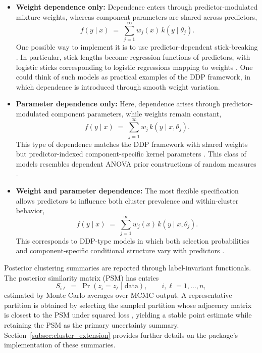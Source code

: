 \documentclass[article]{jss}\usepackage[]{graphicx}\usepackage[]{xcolor}
\begin{document}
\begin{itemize}
\item \textbf{Weight dependence only:} Dependence enters through predictor-modulated mixture weights, whereas component parameters are shared across predictors,
\begin{equation}
f(y\mid x) \;=\; \sum_{j=1}^{\infty} w_j(x)\, k\!\left(y\mid \theta_j\right).
\label{eq:clust_weights_only}
\end{equation}
One possible way to implement it is to use predictor-dependent stick-breaking \citep{MacEachern2000,Quintana2022}. In particular, stick lengths become regression functions of predictors, with logistic sticks corresponding to logistic regressions mapping to weights \citep{Ren2011}. One could think of such models as practical examples of the DDP framework, in which dependence is introduced through smooth weight variation.

\item \textbf{Parameter dependence only:} Here, dependence arises through predictor-modulated component parameters, while weights remain constant,
\begin{equation}
f(y\mid x) \;=\; \sum_{j=1}^{\infty} w_j\, k\!\left(y\mid x,\theta_j\right).
\label{eq:clust_param_only}
\end{equation}
This type of dependence matches the DDP framework with shared weights but predictor-indexed component-specific kernel parameters \citep{MacEachern1999,MacEachern2000}. This class of models resembles dependent ANOVA prior constructions of random measures \citep{DeIorio2004}.


\item \textbf{Weight and parameter dependence:} The most flexible
specification allows predictors to influence both cluster prevalence
and within-cluster behavior,
\begin{equation}
f(y\mid x) \;=\; \sum_{j=1}^{\infty} w_j(x)\, k\!\left(y\mid x,\theta_j\right).
\label{eq:clust_both}
\end{equation}
This corresponds to DDP-type models in which both selection
probabilities and component-specific conditional structure vary with
predictors \citep{Quintana2022}.
\end{itemize}

Posterior clustering summaries are reported through label-invariant
functionals.  The posterior similarity matrix (PSM) has entries
\begin{equation}
S_{i\ell} \;=\; \Pr(z_i=z_\ell \mid \text{data}), \qquad i,\ell=1,\ldots,n,
\label{eq:psm}
\end{equation}
estimated by Monte Carlo averages over MCMC output.  A representative
partition is obtained by selecting the sampled partition whose
adjacency matrix is closest to the PSM under squared loss
\citep{Dahl2006}, yielding a stable point estimate while retaining the
PSM as the primary uncertainty summary.
Section~\ref{subsec:cluster_extension} provides further details on the
package's implementation of these summaries.
\end{document}
